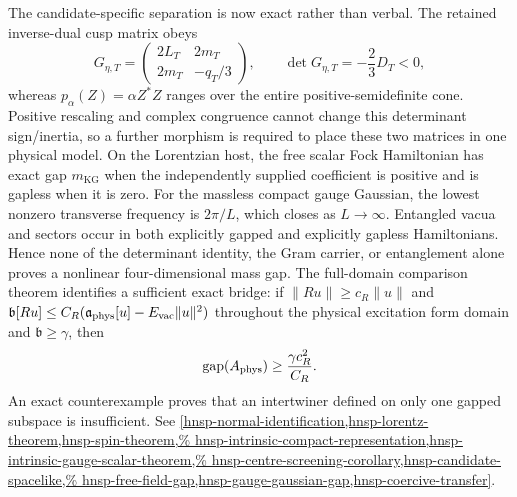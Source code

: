 \begin{enumerate}[leftmargin=1.8em]
The candidate-specific separation is now exact rather than verbal.  The
retained inverse-dual cusp matrix obeys
\[
 G_{\eta,T}=\begin{pmatrix}2L_T&2m_T\\2m_T&-q_T/3\end{pmatrix},
 \qquad \det G_{\eta,T}=-\frac23D_T<0,
\]
whereas \(p_\alpha(Z)=\alpha Z^*Z\) ranges over the entire
positive-semidefinite cone.  Positive rescaling and complex congruence cannot
change this determinant sign/inertia, so a further morphism is required to
place these two matrices in one physical model.  On the Lorentzian host, the
free scalar Fock Hamiltonian has exact gap \(m_{\mathrm{KG}}\) when the
independently supplied coefficient is positive and is gapless when it is
zero.  For the massless compact gauge Gaussian, the lowest nonzero transverse
frequency is \(2\pi/L\), which closes as \(L\to\infty\).  Entangled vacua and
sectors occur in both explicitly gapped and explicitly gapless Hamiltonians.
Hence none of the determinant identity, the Gram carrier, or entanglement
alone proves a nonlinear four-dimensional mass gap.  The full-domain
comparison theorem identifies a sufficient exact bridge: if
\(\|Ru\|\geq c_R\|u\|\) and
\(\mathfrak b[Ru]\leq C_R(\mathfrak a_{\rm phys}[u]-
E_{\rm vac}\|u\|^2)\) throughout the physical excitation form domain and
\(\mathfrak b\geq\gamma\), then
\[
 \operatorname{gap}(A_{\rm phys})\geq\frac{\gamma c_R^2}{C_R}.
\]
An exact counterexample proves that an intertwiner defined on only one gapped
subspace is insufficient.  See
\cref{hnsp-normal-identification,hnsp-lorentz-theorem,hnsp-spin-theorem,%
hnsp-intrinsic-compact-representation,hnsp-intrinsic-gauge-scalar-theorem,%
hnsp-centre-screening-corollary,hnsp-candidate-spacelike,%
hnsp-free-field-gap,hnsp-gauge-gaussian-gap,hnsp-coercive-transfer}.


\end{enumerate}
